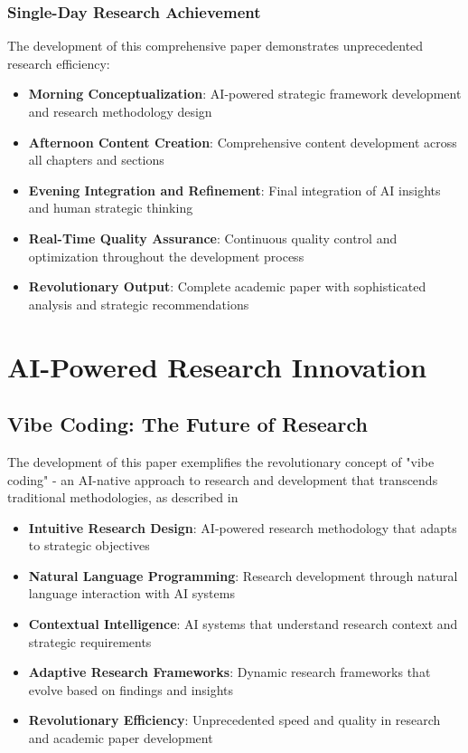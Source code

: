 \documentclass[12pt,a4paper]{book}
\begin{document}
\subsubsection{Single-Day Research Achievement}

The development of this comprehensive paper demonstrates unprecedented research efficiency:

\begin{itemize}
    \item \textbf{Morning Conceptualization}: AI-powered strategic framework development and research methodology design
    \item \textbf{Afternoon Content Creation}: Comprehensive content development across all chapters and sections
    \item \textbf{Evening Integration and Refinement}: Final integration of AI insights and human strategic thinking
    \item \textbf{Real-Time Quality Assurance}: Continuous quality control and optimization throughout the development process
    \item \textbf{Revolutionary Output}: Complete academic paper with sophisticated analysis and strategic recommendations
\end{itemize}

\section{AI-Powered Research Innovation}

\subsection{Vibe Coding: The Future of Research}

The development of this paper exemplifies the revolutionary concept of "vibe coding" - an AI-native approach to research and development that transcends traditional methodologies, as described in \:

\begin{itemize}
    \item \textbf{Intuitive Research Design}: AI-powered research methodology that adapts to strategic objectives
    \item \textbf{Natural Language Programming}: Research development through natural language interaction with AI systems
    \item \textbf{Contextual Intelligence}: AI systems that understand research context and strategic requirements
    \item \textbf{Adaptive Research Frameworks}: Dynamic research frameworks that evolve based on findings and insights
    \item \textbf{Revolutionary Efficiency}: Unprecedented speed and quality in research and academic paper development
\end{itemize}
\end{document}
